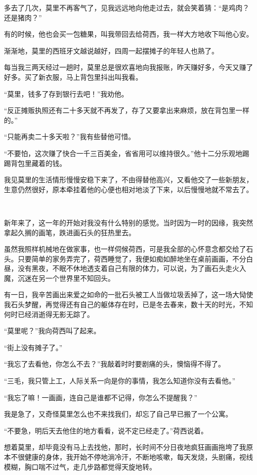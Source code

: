 \par 多去了几次，莫里不再客气了，见我远远地向他走过去，就会笑着猜：“是鸡肉？还是猪肉？”
\par 有的时候，他也会买一包糖果，叫我带回去给荷西，我一样大方地收下叫他心安。
\par 渐渐地，莫里的西班牙文越说越好，四周一起摆摊子的年轻人也熟了。
\par 每当我三两天经过一趟时，莫里总是很欢喜地向我报账，昨天赚好多，今天又赚了好多。买了新衣服，马上背包里抖出叫我看。
\par “莫里，钱多了存到银行去吧！”我劝他。
\par “反正摊贩执照还有二十多天就不再发了，存了又要拿出来麻烦，放在背包里一样的。”
\par “只能再卖二十多天啦？”我有些替他可惜。
\par “不要怕，这次赚了快合一千三百美金，省省用可以维持很久。”他十二分乐观地踢踢背包里藏着的钱。
\par 我见莫里的生活情形慢慢安稳下来了，不由得替他高兴，又看他交了一些新朋友，生意仍然很好，原本牵挂着他的心便也相对地淡了下来，以后慢慢地就不常去了。
\par  
\par 新年来了，这一年的开始对我没有什么特别的感觉。当时因为一时的因缘，我突然拿起久搁的画笔，跌进画石头的狂热里去。
\par 虽然我照样机械地在做家事，也一样伺候荷西，可是我全部的心怀意念都交给了石头。只要简单的家务弄完了，荷西睡觉了，我便如痴如醉地坐在桌前画画，不分白昼，没有黑夜，不眠不休地透支着自己有限的体力，可以说，为了画石头走火入魔，沉迷在另一个世界里不知回头。
\par 有一日，我辛苦画出来爱之如命的一批石头被工人当做垃圾丢掉了，这一场大恸使我石头梦醒，再觉得还有自己的躯体存在时，已是冬去春来，数十天的时光，不知何时已经消逝得无影无踪了。
\par “莫里呢？”我向荷西叫了起来。
\par “街上没有摊子了。”
\par “我忘了去看他，你怎么不去？”我敲着时时要剧痛的头，懊恼得不得了。
\par “三毛，我只管上工，人际关系一向是你的事情，我怎么知道你没有去看他。”
\par “我忘了嘛！一画画，连自己是谁都不记得，你怎么不提醒我？”
\par 我是急了，又奇怪莫里怎么也不来找我们，却忘了自己早已搬了一个公寓。
\par “不要急，明后天去他住的地方看看，说不定已经走了。”荷西说着。
\par 想着莫里，却毕竟没有马上去找他，那时，长时间不分日夜地疯狂画画拖垮了我原本不很健康的身体，我开始不停地淌冷汗，不断地咳嗽，每天发烧，头剧痛，视线模糊，胸口喘不过气，走几步路都觉得天旋地转。
